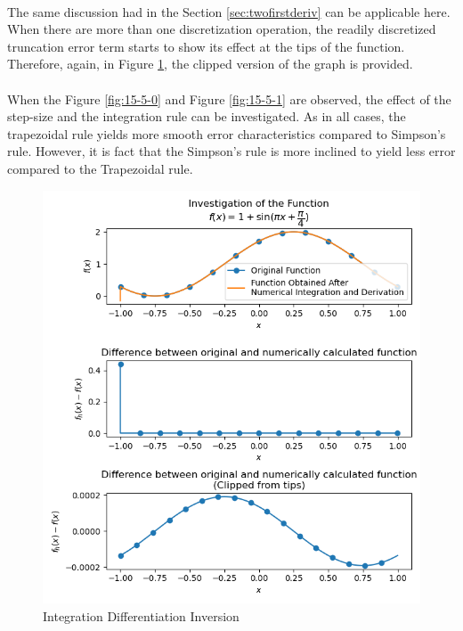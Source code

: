 \documentclass[letterpaper,12pt]{article}
\begin{document}
\paragraph{} The same discussion had in the Section \eqref{sec:twofirstderiv} can be applicable here. When there are more than one discretization operation, the readily discretized truncation error term starts to show its effect at the tips of the function. Therefore, again, in Figure \ref{fig:15-4}, the clipped version of the graph is provided.
\paragraph{} When the Figure \ref{fig:15-5-0} and Figure \ref{fig:15-5-1} are observed, the effect of the step-size and the integration rule can be investigated. As in all cases, the trapezoidal rule yields more smooth error characteristics compared to Simpson's rule. However, it is fact that the Simpson's rule is more inclined to yield less error compared to the Trapezoidal rule. 

\begin{figure}[H]
\centerline{\includegraphics[width=0.8\linewidth]{figures/15-4.png}}
\caption{Integration Differentiation Inversion}
\label{fig:15-4}
\end{figure}
\end{document}
